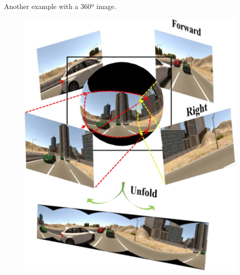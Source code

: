\begin{frame}{\secname}
    Another example with a 360º image. \cite{duan_panoramic_2020}
    \begin{figure}
        \centering
        \includegraphics[height=0.7\textheight]{img/duan_esphere}
    \end{figure}
\end{frame}

